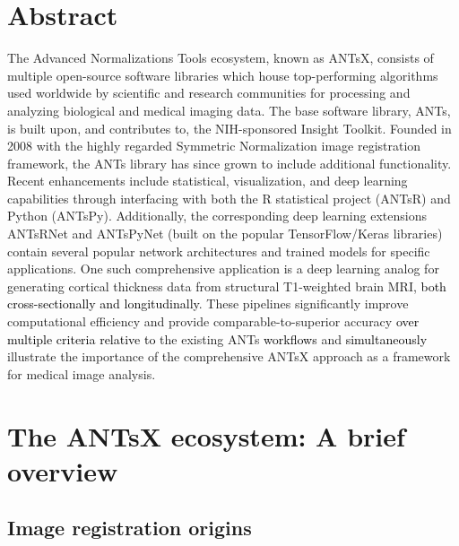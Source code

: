 \documentclass[12pt,]{article}
\begin{document}
\normalsize

\newpage


\hypertarget{abstract}{%
\section*{Abstract}\label{abstract}}

The Advanced Normalizations Tools ecosystem, known as ANTsX, consists of
multiple open-source software libraries which house top-performing
algorithms used worldwide by scientific and research communities for
processing and analyzing biological and medical imaging data. The base
software library, ANTs, is built upon, and contributes to, the
NIH-sponsored Insight Toolkit. Founded in 2008 with the highly regarded
Symmetric Normalization image registration framework, the ANTs library
has since grown to include additional functionality. Recent enhancements
include statistical, visualization, and deep learning capabilities
through interfacing with both the R statistical project (ANTsR) and
Python (ANTsPy). Additionally, the corresponding deep learning
extensions ANTsRNet and ANTsPyNet (built on the popular TensorFlow/Keras
libraries) contain several popular network architectures and trained
models for specific applications. One such comprehensive application is
a deep learning analog for generating cortical thickness data from
structural T1-weighted brain MRI,
\textcolor{black}{both cross-sectionally and longitudinally}. These
pipelines significantly improve computational efficiency and provide
comparable-to-superior accuracy
\textcolor{black}{over multiple criteria relative
to} the existing ANTs \textcolor{black}{workflows} and
\textcolor{black}{simultaneously} illustrate the importance of the
comprehensive ANTsX approach as a framework for medical image analysis.

\newpage

\hypertarget{the-antsx-ecosystem-a-brief-overview}{%
\section*{The ANTsX ecosystem: A brief
overview}\label{the-antsx-ecosystem-a-brief-overview}}

\hypertarget{image-registration-origins}{%
\subsection*{Image registration
origins}\label{image-registration-origins}}
\end{document}
